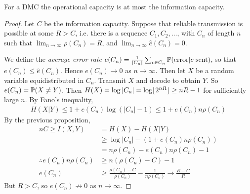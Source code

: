 \documentclass[10pt,a4paper]{article}
\begin{document}
\begin{proposition}
For a DMC the operational capacity is at most the information capacity.
\end{proposition}
\begin{proof}
Let $C$ be the information capacity. Suppose that reliable transmission is possible at some $R>C$, i.e. there is a sequence $C_1, C_2, \ldots$, with $C_n$ of length $n$ such that $\lim_{n\to \infty} \rho(C_n) = R$, and $\lim_{n\to\infty} \hat{e}(C_n) = 0$.

We define the \emph{average error rate} $e(C_n) = \frac{1}{|C_n|}\sum_{c \in C_n}\P(\text{error}|c\text{ sent})$, so that $e(C_n) \leq \hat{e}(C_n)$. Hence $e(C_n) \to 0$ as $n \to \infty$. Then let $X$ be a random variable equidistributed in $C_n$. Transmit $X$ and decode to obtain $Y$. So $e(C_n) = \P(X\neq Y)$. Then $H(X) = \log|C_n| = \log\floor{2^{nR}} \geq nR -1$ for sufficiently large $n$. By Fano's inequality,
\begin{align*}
H(X|Y) \leq 1 +e(C_n)\log(|C_n|-1) \leq 1 + e(C_n)n\rho(C_n)
\end{align*}
By the previous proposition,
\begin{align*}
nC \geq I(X,Y) &= H(X) - H(X|Y) \\
&\geq \log|C_n| - (1+e(C_n)n\rho(C_n))\\
&= n\rho(C_n) - e(C_n)n\rho(C_n) - 1\\
\therefore e(C_n)n\rho(C_n) &\geq n(\rho(C_n) - C)-1\\
e(C_n) &\geq \frac{\rho(C_n) - C}{\rho(C_n)} - \frac{1}{n\rho(C_n)} \to \frac{R-C}{R}
\end{align*}
But $R>C$, so $e(C_n) \not\to 0$ as $n \to \infty$. \contr
\end{proof}
\end{document}
